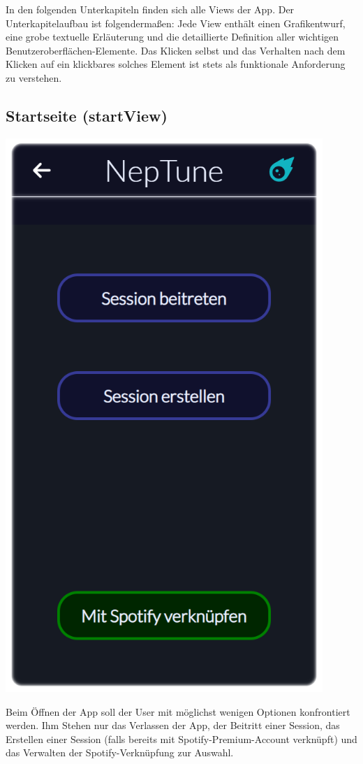 \documentclass[oneside, ngerman]{sdqtechreport}
\begin{document}
In den folgenden Unterkapiteln finden sich alle Views der App. Der Unterkapitelaufbau ist folgendermaßen: Jede View enthält einen Grafikentwurf, eine grobe textuelle Erläuterung und die detaillierte Definition aller wichtigen Benutzeroberflächen-Elemente. Das Klicken selbst und das Verhalten nach dem Klicken auf ein klickbares solches Element ist stets als funktionale Anforderung zu verstehen.


\subsection{Startseite (startView)}
\label{sec:Benutzeroberfläche:startView}

\begin{minipage}{0.5\textwidth}
    \hypertarget{startView}{}
    \includegraphics[width=0.9\textwidth]{LATEX/Pflichtenheft/GraphicDesigns/startPage.png}
\end{minipage} 
\hfill
\begin{minipage}{0.5\textwidth}
    Beim Öffnen der App soll der User mit möglichst wenigen Optionen konfrontiert werden. Ihm Stehen nur das Verlassen der App, der Beitritt einer Session, das Erstellen einer Session (falls bereits mit Spotify-Premium-Account verknüpft) und das Verwalten der Spotify-Verknüpfung zur Auswahl. 
\end{minipage}
\vspace{\baselineskip}
\end{document}
